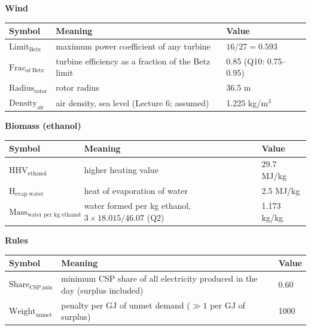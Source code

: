 \documentclass[11pt,a4paper]{article}
\newcommand{\T}[1]{\text{#1}}
\begin{document}
\vspace{6pt}\textbf{Wind}\\[2pt]
\begin{tabular}{@{}lll@{}}
\toprule
Symbol & Meaning & Value\\\midrule
$\T{Limit}_{\T{Betz}}$ & maximum power coefficient of any turbine & $16/27=0.593$\\
$\T{Frac}_{\T{of Betz}}$ & turbine efficiency as a fraction of the Betz limit & 0.85 (Q10: 0.75--0.95)\\
$\T{Radius}_{\T{rotor}}$ & rotor radius & 36.5 m\\
$\T{Density}_{\T{air}}$ & air density, sea level (Lecture 6; assumed) & 1.225 kg/m$^3$\\
\bottomrule
\end{tabular}

\vspace{6pt}\textbf{Biomass (ethanol)}\\[2pt]
\begin{tabular}{@{}lll@{}}
\toprule
Symbol & Meaning & Value\\\midrule
$\T{HHV}_{\T{ethanol}}$ & higher heating value & 29.7 MJ/kg\\
$\T{H}_{\T{evap water}}$ & heat of evaporation of water & 2.5 MJ/kg\\
$\T{Mass}_{\T{water per kg ethanol}}$ & water formed per kg ethanol, $3\times18.015/46.07$ (Q2) & 1.173 kg/kg\\
\bottomrule
\end{tabular}

\vspace{6pt}\textbf{Rules}\\[2pt]
\begin{tabular}{@{}lll@{}}
\toprule
Symbol & Meaning & Value\\\midrule
$\T{Share}_{\T{CSP,min}}$ & minimum CSP share of all electricity produced in the day (surplus included) & 0.60\\
$\T{Weight}_{\T{unmet}}$ & penalty per GJ of unmet demand ($\gg 1$ per GJ of surplus) & 1000\\
\bottomrule
\end{tabular}
\end{document}
